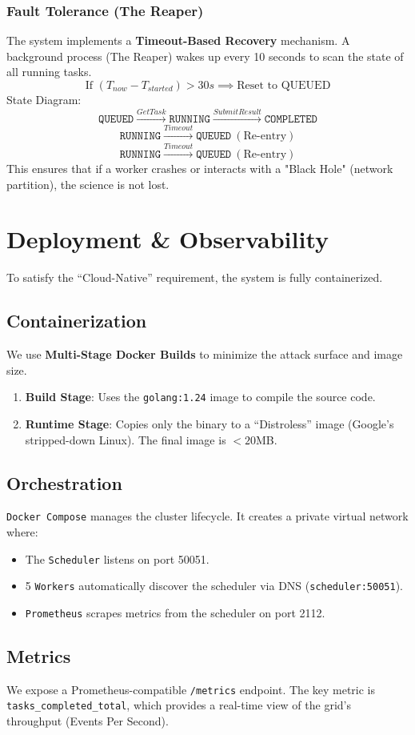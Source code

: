 \subsubsection{Fault Tolerance (The Reaper)}
The system implements a \textbf{Timeout-Based Recovery} mechanism. A background process (The Reaper) wakes up every 10 seconds to scan the state of all running tasks.
\[
\text{If } (T_{now} - T_{started}) > 30s \implies \text{Reset to QUEUED}
\]
State Diagram:
\[
\texttt{QUEUED} \xrightarrow{GetTask} \texttt{RUNNING} \xrightarrow{SubmitResult} \texttt{COMPLETED}
\]
\[
\texttt{RUNNING} \xrightarrow{Timeout} \texttt{QUEUED} \ (\text{Re-entry})
\]
\[
\texttt{RUNNING} \xrightarrow{Timeout} \texttt{QUEUED} \ (\text{Re-entry})
\]
This ensures that if a worker crashes or interacts with a "Black Hole" (network partition), the science is not lost.

\section{Deployment \& Observability}
To satisfy the ``Cloud-Native'' requirement, the system is fully containerized.

\subsection{Containerization}
We use \textbf{Multi-Stage Docker Builds} to minimize the attack surface and image size.
\begin{enumerate}
    \item \textbf{Build Stage}: Uses the \texttt{golang:1.24} image to compile the source code.
    \item \textbf{Runtime Stage}: Copies only the binary to a ``Distroless'' image (Google's stripped-down Linux). The final image is $<20$MB.
\end{enumerate}

\subsection{Orchestration}
\texttt{Docker Compose} manages the cluster lifecycle. It creates a private virtual network where:
\begin{itemize}
    \item The \texttt{Scheduler} listens on port 50051.
    \item 5 \texttt{Workers} automatically discover the scheduler via DNS (\texttt{scheduler:50051}).
    \item \texttt{Prometheus} scrapes metrics from the scheduler on port 2112.
\end{itemize}

\subsection{Metrics}
We expose a Prometheus-compatible \texttt{/metrics} endpoint. The key metric is \texttt{tasks\_completed\_total}, which provides a real-time view of the grid's throughput (Events Per Second).
